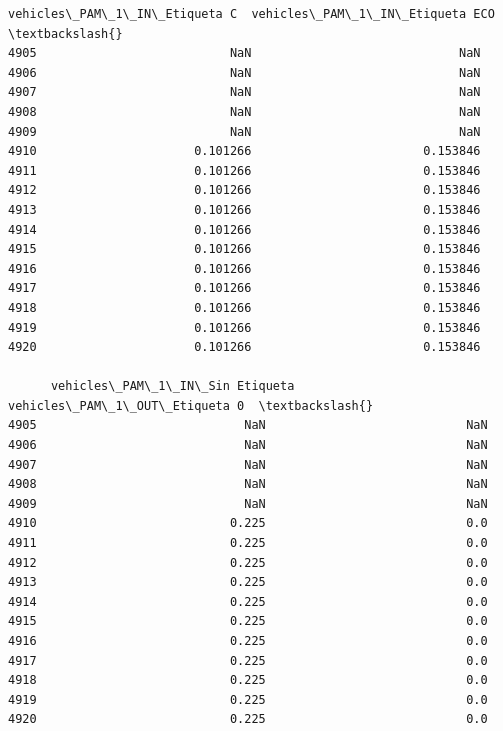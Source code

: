 \documentclass[11pt]{article}
\begin{document}
\begin{tcolorbox}[breakable, size=fbox, boxrule=.5pt, pad at break*=1mm, opacityfill=0]
\begin{Verbatim}[commandchars=\\\{\}]
      vehicles\_PAM\_1\_IN\_Etiqueta C  vehicles\_PAM\_1\_IN\_Etiqueta ECO  \textbackslash{}
4905                           NaN                             NaN
4906                           NaN                             NaN
4907                           NaN                             NaN
4908                           NaN                             NaN
4909                           NaN                             NaN
4910                      0.101266                        0.153846
4911                      0.101266                        0.153846
4912                      0.101266                        0.153846
4913                      0.101266                        0.153846
4914                      0.101266                        0.153846
4915                      0.101266                        0.153846
4916                      0.101266                        0.153846
4917                      0.101266                        0.153846
4918                      0.101266                        0.153846
4919                      0.101266                        0.153846
4920                      0.101266                        0.153846

      vehicles\_PAM\_1\_IN\_Sin Etiqueta  vehicles\_PAM\_1\_OUT\_Etiqueta 0  \textbackslash{}
4905                             NaN                            NaN
4906                             NaN                            NaN
4907                             NaN                            NaN
4908                             NaN                            NaN
4909                             NaN                            NaN
4910                           0.225                            0.0
4911                           0.225                            0.0
4912                           0.225                            0.0
4913                           0.225                            0.0
4914                           0.225                            0.0
4915                           0.225                            0.0
4916                           0.225                            0.0
4917                           0.225                            0.0
4918                           0.225                            0.0
4919                           0.225                            0.0
4920                           0.225                            0.0


\end{Verbatim}
\end{tcolorbox}
\end{document}
